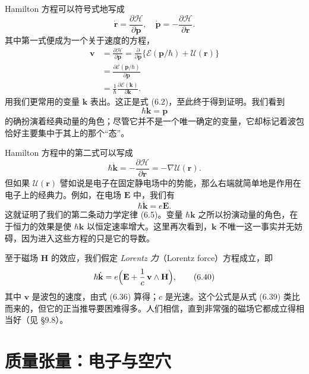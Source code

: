 Hamilton 方程可以符号式地写成
\begin{equation*}
\dot{\mathbf{r}}=\frac{\partial\mathcal{H}}{\partial\mathbf{p}},\quad \dot{\mathbf{p}}=-\frac{\partial\mathcal{H}}{\partial\mathbf{r}}. \tag{6.35}
\end{equation*}
其中第一式便成为一个关于速度的方程，
\begin{align*}
\mathbf{v}&=\frac{\partial\mathcal{H}}{\partial\mathbf{p}}=\frac{\partial}{\partial\mathbf{p}}\bigl\{\mathcal{E}(\mathbf{p}/\hbar)+\mathcal{U}(\mathbf{r})\bigr\}\\
&=\frac{\partial\mathcal{E}(\mathbf{p}/\hbar)}{\partial\mathbf{p}}\\
&=\frac{1}{\hbar}\frac{\partial\mathcal{E}(\mathbf{k})}{\partial\mathbf{k}}. \tag{6.36}
\end{align*}
用我们更常用的变量 $\mathbf{k}$ 表出。这正是式 (6.2)，至此终于得到证明。我们看到
\begin{equation*}
\hbar\mathbf{k}=\mathbf{p} \tag{6.37}
\end{equation*}
的确扮演着经典动量的角色；尽管它并不是一个唯一确定的变量，它却标记着波包恰好主要集中于其上的那个“态”。

Hamilton 方程中的第二式可以写成
\begin{equation*}
\hbar\dot{\mathbf{k}}=-\frac{\partial\mathcal{H}}{\partial\mathbf{r}}=-\nabla\mathcal{U}(\mathbf{r}). \tag{6.38}
\end{equation*}
但如果 $\mathcal{U}(\mathbf{r})$ 譬如说是电子在固定静电场中的势能，那么右端就简单地是作用在电子上的经典力。例如，在电场 $\mathbf{E}$ 中，我们有
\begin{equation*}
\hbar\dot{\mathbf{k}}=e\mathbf{E}. \tag{6.39}
\end{equation*}
这就证明了我们的第二条动力学定律 (6.5)。变量 $\hbar\mathbf{k}$ 之所以扮演动量的角色，在于恒力的效果是使 $\hbar\mathbf{k}$ 以恒定速率增大。这里再次看到，$\mathbf{k}$ 不唯一这一事实并无妨碍，因为进入这些方程的只是它的导数。

至于磁场 $\mathbf{H}$ 的效应，我们假定 \emph{Lorentz 力}（Lorentz force）方程成立，即
\begin{equation*}
\hbar\dot{\mathbf{k}}=e\Bigl(\mathbf{E}+\frac{1}{c}\,\mathbf{v}\wedge\mathbf{H}\Bigr), \tag{6.40}
\end{equation*}
其中 $\mathbf{v}$ 是波包的速度，由式 (6.36) 算得；$c$ 是光速。这个公式是从式 (6.39) 类比而来的，但它的正当推导要困难得多。人们相信，直到非常强的磁场它都成立得相当好（见 §9.8）。

\section{质量张量：电子与空穴}

